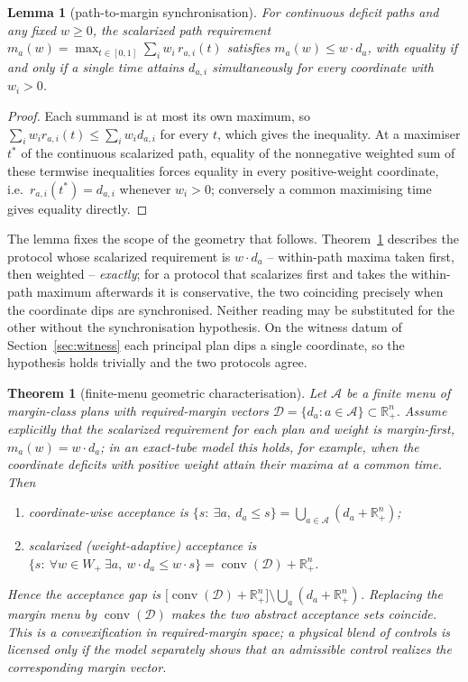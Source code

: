 \documentclass[preprint,11pt,authoryear]{elsarticle}
\newtheorem{theorem}{Theorem}
\newtheorem{lemma}{Lemma}
\theoremstyle{definition}
\theoremstyle{remark}
\newcommand{\Wp}{W_+}
\newcommand{\conv}{\operatorname{conv}}
\newcommand{\Rp}{\mathbb{R}^n_+}
\begin{document}
\begin{lemma}[path-to-margin synchronisation]\label{lem:sync}
For continuous deficit paths and any fixed $w\ge0$, the scalarized path requirement $m_a(w)=\max_{t\in[0,1]}\sum_iw_i\,r_{a,i}(t)$ satisfies $m_a(w)\le w\cdot d_a$, with equality if and only if a single time attains $d_{a,i}$ simultaneously for every coordinate with $w_i>0$.
\end{lemma}
\begin{proof}
Each summand is at most its own maximum, so $\sum_iw_ir_{a,i}(t)\le\sum_iw_id_{a,i}$ for every $t$, which gives the inequality. At a maximiser $t^\ast$ of the continuous scalarized path, equality of the nonnegative weighted sum of these termwise inequalities forces equality in every positive-weight coordinate, i.e.\ $r_{a,i}(t^\ast)=d_{a,i}$ whenever $w_i>0$; conversely a common maximising time gives equality directly.
\end{proof}

The lemma fixes the scope of the geometry that follows. Theorem~\ref{thm:menu} describes the protocol whose scalarized requirement is $w\cdot d_a$ -- within-path maxima taken first, then weighted -- \emph{exactly}; for a protocol that scalarizes first and takes the within-path maximum afterwards it is conservative, the two coinciding precisely when the coordinate dips are synchronised. Neither reading may be substituted for the other without the synchronisation hypothesis. On the witness datum of Section~\ref{sec:witness} each principal plan dips a single coordinate, so the hypothesis holds trivially and the two protocols agree.

\begin{theorem}[finite-menu geometric characterisation]\label{thm:menu}
Let $\mathcal A$ be a finite menu of margin-class plans with required-margin vectors $\mathcal D=\{d_a:a\in\mathcal A\}\subset\Rp$. Assume explicitly that the scalarized requirement for each plan and weight is margin-first, $m_a(w)=w\cdot d_a$; in an exact-tube model this holds, for example, when the coordinate deficits with positive weight attain their maxima at a common time. Then
\begin{enumerate}[label=\textup{(\roman*)},leftmargin=2em]
\item coordinate-wise acceptance is $\{s:\ \exists a,\ d_a\le s\}=\bigcup_{a\in\mathcal A}(d_a+\Rp)$;
\item scalarized (weight-adaptive) acceptance is $\{s:\ \forall w\in\Wp\ \exists a,\ w\cdot d_a\le w\cdot s\}=\conv(\mathcal D)+\Rp$.
\end{enumerate}
Hence the acceptance gap is $\big[\conv(\mathcal D)+\Rp\big]\setminus\bigcup_{a}(d_a+\Rp)$. Replacing the margin menu by $\conv(\mathcal D)$ makes the two abstract acceptance sets coincide. This is a convexification in required-margin space; a physical blend of controls is licensed only if the model separately shows that an admissible control realizes the corresponding margin vector.
\end{theorem}
\end{document}
